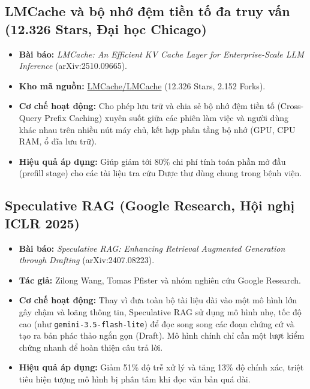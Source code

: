 \documentclass[12pt,a4paper]{article}
\begin{document}
\subsection{LMCache và bộ nhớ đệm tiền tố đa truy vấn (12.326 Stars, Đại học Chicago)}
\begin{itemize}[leftmargin=1.5em]
    \item \textbf{Bài báo:} \textit{LMCache: An Efficient KV Cache Layer for Enterprise-Scale LLM Inference} (arXiv:2510.09665).
    \item \textbf{Kho mã nguồn:} \href{https://github.com/LMCache/LMCache}{LMCache/LMCache} (12.326 Stars, 2.152 Forks).
    \item \textbf{Cơ chế hoạt động:} Cho phép lưu trữ và chia sẻ bộ nhớ đệm tiền tố (Cross-Query Prefix Caching) xuyên suốt giữa các phiên làm việc và người dùng khác nhau trên nhiều nút máy chủ, kết hợp phân tầng bộ nhớ (GPU, CPU RAM, ổ đĩa lưu trữ).
    \item \textbf{Hiệu quả áp dụng:} Giúp giảm tới 80\% chi phí tính toán phần mở đầu (prefill stage) cho các tài liệu tra cứu Dược thư dùng chung trong bệnh viện.
\end{itemize}

\subsection{Speculative RAG (Google Research, Hội nghị ICLR 2025)}
\begin{itemize}[leftmargin=1.5em]
    \item \textbf{Bài báo:} \textit{Speculative RAG: Enhancing Retrieval Augmented Generation through Drafting} (arXiv:2407.08223).
    \item \textbf{Tác giả:} Zilong Wang, Tomas Pfister và nhóm nghiên cứu Google Research.
    \item \textbf{Cơ chế hoạt động:} Thay vì đưa toàn bộ tài liệu dài vào một mô hình lớn gây chậm và loãng thông tin, Speculative RAG sử dụng mô hình nhẹ, tốc độ cao (như \texttt{gemini-3.5-flash-lite}) để đọc song song các đoạn chứng cứ và tạo ra bản phác thảo ngắn gọn (Draft). Mô hình chính chỉ cần một lượt kiểm chứng nhanh để hoàn thiện câu trả lời.
    \item \textbf{Hiệu quả áp dụng:} Giảm 51\% độ trễ xử lý và tăng 13\% độ chính xác, triệt tiêu hiện tượng mô hình bị phân tâm khi đọc văn bản quá dài.
\end{itemize}
\end{document}
